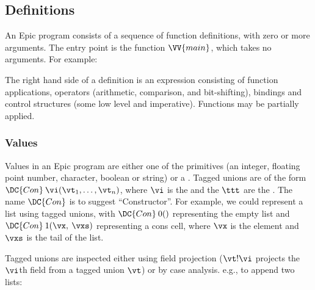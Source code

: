 \subsection{Definitions}

An Epic program consists of a sequence of  function
definitions, with zero or more arguments. The entry point is the
function $\VV{main}$, which takes no arguments. For example:


\noindent
The right hand side of a definition is an expression consisting of
function applications, operators (arithmetic, comparison, and
bit-shifting), bindings and control structures (some low level and
imperative).  Functions may be partially applied.

\subsubsection*{Values}

Values in an Epic program are either one of the primitives (an
integer, floating point number, character, boolean or string) or a
. Tagged unions are of the form $\DC{Con}\:
\vi(\vt_1,\ldots,\vt_n)$, where $\vi$ is the  and the $\ttt$
are the . The name $\DC{Con}$ is to suggest
``Constructor''. For example, we could represent a list using tagged
unions, with $\DC{Con}\:0()$ representing the empty list and
$\DC{Con}\:1(\vx,\:\vxs)$ representing a cons cell, where $\vx$
is the element and $\vxs$ is the tail of the list.

Tagged unions are inspected either using field projection ($\vt!\vi$
projects the $\vi$th field from a tagged union $\vt$) or by case
analysis. e.g., to append two lists:


